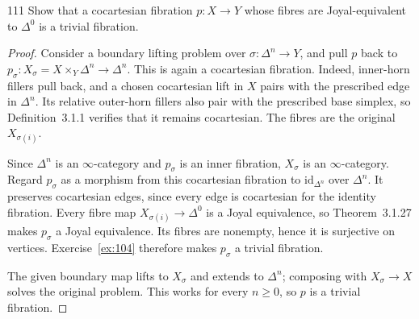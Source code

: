 \begin{exercise}{111}
Show that a cocartesian fibration $p\colon X\to Y$ whose fibres are Joyal-equivalent
to $\Delta^0$ is a trivial fibration.

\begin{proof}
Consider a boundary lifting problem over
$\sigma\colon\Delta^n\to Y$, and pull $p$ back to
$p_\sigma\colon X_\sigma=X\times_Y\Delta^n\to\Delta^n$.
This is again a cocartesian fibration.
Indeed, inner-horn fillers pull back, and a chosen cocartesian lift
in $X$ pairs with the prescribed edge in $\Delta^n$.
Its relative outer-horn fillers also pair with the prescribed base
simplex, so Definition~3.1.1 verifies that it remains cocartesian.
The fibres are the original $X_{\sigma(i)}$.

Since $\Delta^n$ is an $\infty$-category and $p_\sigma$ is an inner
fibration, $X_\sigma$ is an $\infty$-category.
Regard $p_\sigma$ as a morphism from this cocartesian fibration to
$\mathrm{id}_{\Delta^n}$ over $\Delta^n$.
It preserves cocartesian edges, since every edge is cocartesian for
the identity fibration.
Every fibre map $X_{\sigma(i)}\to\Delta^0$ is a Joyal equivalence,
so Theorem~3.1.27 makes $p_\sigma$ a Joyal equivalence.
Its fibres are nonempty, hence it is surjective on vertices.
Exercise~\ref{ex:104} therefore makes $p_\sigma$ a trivial fibration.

The given boundary map lifts to $X_\sigma$ and extends to $\Delta^n$;
composing with $X_\sigma\to X$ solves the original problem.
This works for every $n\ge0$, so $p$ is a trivial fibration.
\end{proof}
\end{exercise}
